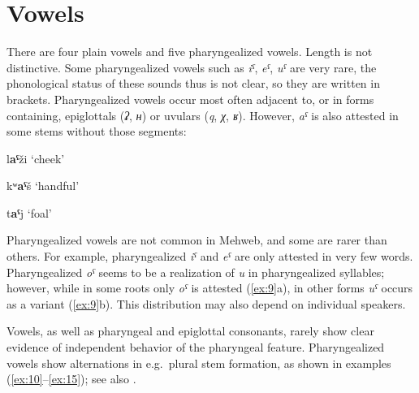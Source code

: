 \documentclass[output=paper]{langsci/langscibook}
\begin{document}
\section{Vowels}\label{vowels}

There are four plain vowels and five pharyngealized vowels. Length is
not distinctive. Some pharyngealized vowels such as \emph{iˤ},
\emph{eˤ}, \emph{uˤ} are very rare, the phonological
%
%    
status of these
sounds thus is not clear, so they are written in brackets.
Pharyngealized vowels occur most often adjacent to, or in forms
containing, epiglottals (\emph{ʡ}, \emph{ʜ}) or uvulars (\emph{q}, \emph{χ},
\emph{ʁ}). However, \emph{aˤ} is also attested in some stems without
those segments:

\ea \label{ex:6} %
l\textbf{aˤ}ži
\glt `cheek'

\ex \label{ex:7} %
kʷ\textbf{aˤ}š
\glt `handful'

\ex \label{ex:8} %
t\textbf{aˤ}j
\glt `foal'
\z

Pharyngealized vowels are not common in Mehweb, and some are rarer than
others. For example, pharyngealized \emph{iˤ} and \emph{eˤ} are only
attested in very few words. Pharyngealized \emph{oˤ} seems to be a
realization of \emph{u} in pharyngealized syllables; however, while in
some roots only \emph{oˤ} is attested (\ref{ex:9}a), in other forms \emph{uˤ}
occurs as a variant (\ref{ex:9}b). This distribution may also depend on individual speakers.

\ea \label{ex:9} %
\ea {}%
\exsameline %
%
\z
\z


Vowels, as well as pharyngeal and epiglottal consonants, rarely show
clear evidence of independent behavior of the pharyngeal feature. Pharyngealized vowels show alternations in
e.g.\ plural stem formation, as shown in examples (\ref{ex:10}–\ref{ex:15}); see also
\citet{chechuro2019}.

\ea \label{ex:10} %
\ea {}%
%
\exsameline %
\z
\end{document}
